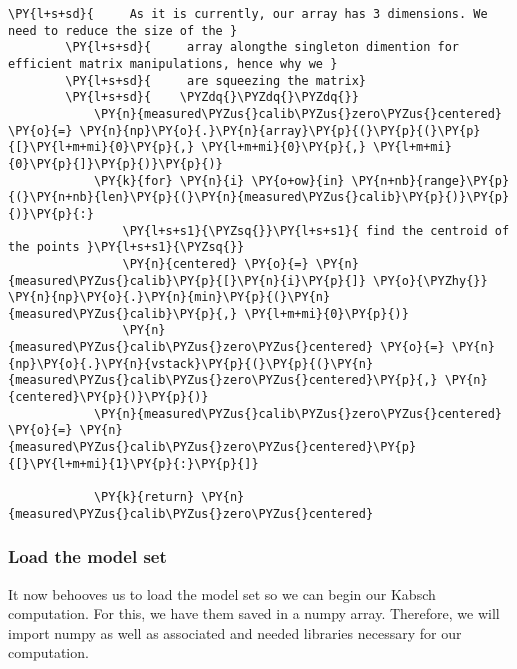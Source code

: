 \begin{Verbatim}[commandchars=\\\{\}]
        \PY{l+s+sd}{     As it is currently, our array has 3 dimensions. We need to reduce the size of the }
        \PY{l+s+sd}{     array alongthe singleton dimention for efficient matrix manipulations, hence why we }
        \PY{l+s+sd}{     are squeezing the matrix}
        \PY{l+s+sd}{    \PYZdq{}\PYZdq{}\PYZdq{}}
            \PY{n}{measured\PYZus{}calib\PYZus{}zero\PYZus{}centered} \PY{o}{=} \PY{n}{np}\PY{o}{.}\PY{n}{array}\PY{p}{(}\PY{p}{(}\PY{p}{[}\PY{l+m+mi}{0}\PY{p}{,} \PY{l+m+mi}{0}\PY{p}{,} \PY{l+m+mi}{0}\PY{p}{]}\PY{p}{)}\PY{p}{)}
            \PY{k}{for} \PY{n}{i} \PY{o+ow}{in} \PY{n+nb}{range}\PY{p}{(}\PY{n+nb}{len}\PY{p}{(}\PY{n}{measured\PYZus{}calib}\PY{p}{)}\PY{p}{)}\PY{p}{:}
                \PY{l+s+s1}{\PYZsq{}}\PY{l+s+s1}{ find the centroid of the points }\PY{l+s+s1}{\PYZsq{}}
                \PY{n}{centered} \PY{o}{=} \PY{n}{measured\PYZus{}calib}\PY{p}{[}\PY{n}{i}\PY{p}{]} \PY{o}{\PYZhy{}} \PY{n}{np}\PY{o}{.}\PY{n}{min}\PY{p}{(}\PY{n}{measured\PYZus{}calib}\PY{p}{,} \PY{l+m+mi}{0}\PY{p}{)}
                \PY{n}{measured\PYZus{}calib\PYZus{}zero\PYZus{}centered} \PY{o}{=} \PY{n}{np}\PY{o}{.}\PY{n}{vstack}\PY{p}{(}\PY{p}{(}\PY{n}{measured\PYZus{}calib\PYZus{}zero\PYZus{}centered}\PY{p}{,} \PY{n}{centered}\PY{p}{)}\PY{p}{)} 
            \PY{n}{measured\PYZus{}calib\PYZus{}zero\PYZus{}centered} \PY{o}{=} \PY{n}{measured\PYZus{}calib\PYZus{}zero\PYZus{}centered}\PY{p}{[}\PY{l+m+mi}{1}\PY{p}{:}\PY{p}{]}
        
            \PY{k}{return} \PY{n}{measured\PYZus{}calib\PYZus{}zero\PYZus{}centered}
\end{Verbatim}


    \subsubsection{Load the model set}\label{load-the-model-set}

It now behooves us to load the model set so we can begin our Kabsch
computation. For this, we have them saved in a numpy array. Therefore,
we will import numpy as well as associated and needed libraries
necessary for our computation.

